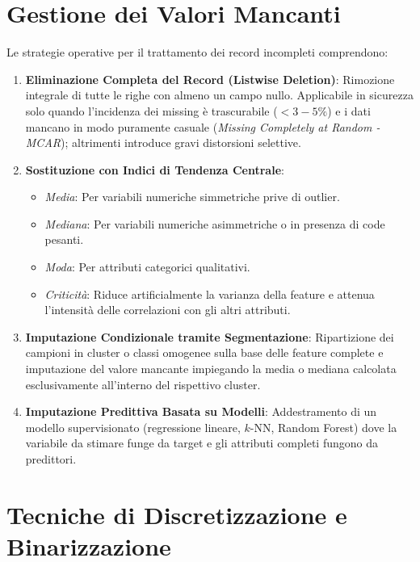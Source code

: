 \section{Gestione dei Valori Mancanti}
\label{sec:dm-missing-values-handling}

Le strategie operative per il trattamento dei record incompleti comprendono:

\begin{enumerate}
    \item \textbf{Eliminazione Completa del Record (Listwise Deletion)}: Rimozione integrale di tutte le righe con almeno un campo nullo. Applicabile in sicurezza solo quando l'incidenza dei missing è trascurabile ($< 3-5\%$) e i dati mancano in modo puramente casuale (\textit{Missing Completely at Random - MCAR}); altrimenti introduce gravi distorsioni selettive.
    \item \textbf{Sostituzione con Indici di Tendenza Centrale}:
    \begin{itemize}[noitemsep]
        \item \textit{Media}: Per variabili numeriche simmetriche prive di outlier.
        \item \textit{Mediana}: Per variabili numeriche asimmetriche o in presenza di code pesanti.
        \item \textit{Moda}: Per attributi categorici qualitativi.
        \item \textit{Criticità}: Riduce artificialmente la varianza della feature e attenua l'intensità delle correlazioni con gli altri attributi.
    \end{itemize}
    \item \textbf{Imputazione Condizionale tramite Segmentazione}: Ripartizione dei campioni in cluster o classi omogenee sulla base delle feature complete e imputazione del valore mancante impiegando la media o mediana calcolata esclusivamente all'interno del rispettivo cluster.
    \item \textbf{Imputazione Predittiva Basata su Modelli}: Addestramento di un modello supervisionato (regressione lineare, $k$-NN, Random Forest) dove la variabile da stimare funge da target e gli attributi completi fungono da predittori.
\end{enumerate}

\FloatBarrier
\section{Tecniche di Discretizzazione e Binarizzazione}
\label{sec:dm-discretization-binning}

